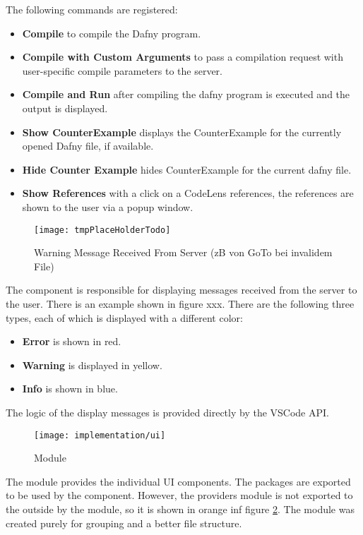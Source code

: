 The following commands are registered:
\begin{itemize}
    \item {\bf Compile} \textendash{} to compile the Dafny program.
    \item {\bf Compile with Custom Arguments} \textendash{} to pass a compilation request with user-specific
    compile parameters to the server.
    \item {\bf Compile and Run} \textendash{} after compiling the dafny program is executed and the output is displayed.
    \item {\bf Show CounterExample} \textendash{} displays the CounterExample for the currently opened Dafny file, if available.
    \item {\bf Hide Counter Example} \textendash{} hides CounterExample for the current dafny file.
    \item {\bf Show References} \textendash{} with a click on a CodeLens references,
    the references are shown to the user via a popup window.
\end{itemize}

\begin{figure}[H]
    \centering
    \texttt{[image: tmpPlaceHolderTodo]}
    \caption{Warning Message Received From Server (zB von GoTo bei invalidem File)}
    \label{fig:msg_example}
\end{figure}

The  component is responsible for displaying messages received from the server to the user.
There is an example shown in figure xxx.
There are the following three types, each of which is displayed with a different color:

\begin{itemize}
    \item {\bf Error} \textendash{} is shown in red.
    \item {\bf Warning} \textendash{} is displayed in yellow.
    \item {\bf Info} \textendash{} is shown in blue.
\end{itemize}

The logic of the display messages is provided directly by the VSCode API.

\begin{figure}[H]
    \centering
    \texttt{[image: implementation/ui]}
    \caption{Module }
    \label{fig:ui_module}
\end{figure}

The  module provides the individual UI components.
The packages are exported to be used by the  component.
However, the providers module is not exported to the outside by the  module,
so it is shown in orange inf figure \ref{fig:ui_module}.
The module was created purely for grouping and a better file structure.\\

